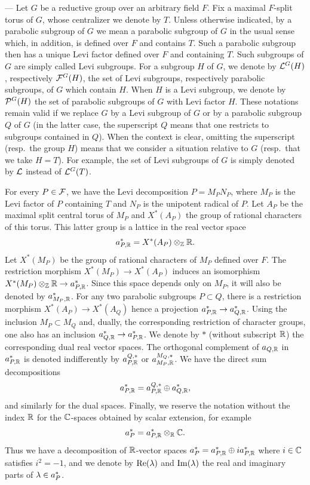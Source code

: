 \begin{paragr}[Notations.] ---\label{S:notations2}
   Let $G$ be a reductive group over an arbitrary field $F$. Fix a maximal $F$-split torus of $G$, whose centralizer we denote by $T$. Unless otherwise indicated, by a \og parabolic subgroup of $G$\fg{} we mean a parabolic subgroup of $G$ in the usual sense which, in addition, is defined over $F$ and contains $T$. Such a parabolic subgroup then has a unique Levi factor defined over $F$ and containing $T$. Such subgroups of $G$ are simply called Levi subgroups. For a subgroup $H$ of $G$, we denote by $\mathcal{L}^G(H)$, respectively $\mathcal{F}^G(H)$, the set of Levi subgroups, respectively parabolic subgroups, of $G$ which contain $H$. When $H$ is a Levi subgroup, we denote by $\mathcal{P}^G(H)$ the set of parabolic subgroups of $G$ with Levi factor $H$. These notations remain valid if we replace $G$ by a Levi subgroup of $G$ or by a parabolic subgroup $Q$ of $G$ (in the latter case, the superscript $Q$ means that one restricts to subgroups contained in $Q$). When the context is clear, omitting the superscript (resp.\ the group $H$) means that we consider a situation relative to $G$ (resp.\ that we take $H=T$). For example, the set of Levi subgroups of $G$ is simply denoted by $\mathcal{L}$ instead of $\mathcal{L}^G(T)$.
\medskip

For every $P\in \mathcal{F}$, we have the Levi decomposition $P=M_PN_P$, where $M_P$ is the Levi factor of $P$ containing $T$ and $N_P$ is the unipotent radical of $P$. Let $A_P$ be the maximal split central torus of $M_P$ and $X^*(A_P)$ the group of rational characters of this torus. This latter group is a lattice in the real vector space
$$a_{P,\mathbb{R}}^*=X^*(A_P)\otimes_{\mathbb{Z}} \mathbb{R}.$$
Let $X^*(M_P)$ be the group of rational characters of $M_P$ defined over $F$. The restriction morphism $X^*(M_P)\to X^*(A_P)$ induces an isomorphism $X^*(M_P)\otimes_{\mathbb{Z}} \mathbb{R}\to a_{P,\mathbb{R}}^*$. Since this space depends only on $M_P$, it will also be denoted by $a_{M_P,\mathbb{R}}^*$. For any two parabolic subgroups $P\subset Q$, there is a restriction morphism $X^*(A_P)\to X^*(A_Q)$ hence a projection $a_{P,\mathbb{R}}^*\to a_{Q,\mathbb{R}}^*$. Using the inclusion $M_P\subset M_Q$ and, dually, the corresponding restriction of character groups, one also has an inclusion $a_{Q,\mathbb{R}}^*\to a_{P,\mathbb{R}}^*$. We denote by $*$ (without subscript $\mathbb{R}$) the corresponding dual real vector spaces. The orthogonal complement of $a_{Q,\mathbb{R}}$ in $a_{P,\mathbb{R}}^*$ is denoted indifferently by $a_{P,\mathbb{R}}^{Q,*}$ or $a_{M_P,\mathbb{R}}^{M_Q,*}$. We have the direct sum decompositions
$$ a_{P,\mathbb{R}}^{*}= a_{P,\mathbb{R}}^{Q,*}\oplus a_{Q,\mathbb{R}}^{*},$$
and similarly for the dual spaces. Finally, we reserve the notation without the index $\mathbb{R}$ for the $\mathbb{C}$-spaces obtained by scalar extension, for example
$$ a_{P}^{*}=a_{P,\mathbb{R}}^{*}\otimes_{\mathbb{R}}\mathbb{C}.$$
Thus we have a decomposition of $\mathbb{R}$-vector spaces $ a_{P}^{*}=a_{P,\mathbb{R}}^{*}\oplus ia_{P,\mathbb{R}}^{*}$ where $i\in \mathbb{C}$ satisfies $i^2=-1$, and we denote by $\mathop{\mathrm{Re}}\nolimits(\lambda)$ and $\mathop{\mathrm{Im}}\nolimits(\lambda)$ the real and imaginary parts of $\lambda\in  a_{P}^{*}$.


\end{paragr}
